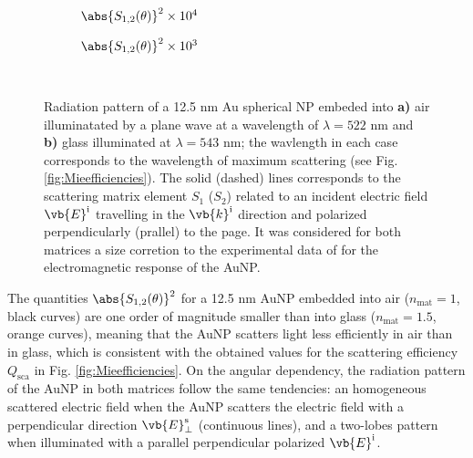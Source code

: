\begin{figure}[h!]
	\def\svgwidth{.9\textwidth} \small\centering
		\vspace*{3.25em}
		\hspace*{-.25\textwidth}
	\begin{subfigure}{.25\textwidth}%
		\caption{$\abs{S_{1,2}(\theta)}^2\times 10^4$} \label{fig:ScatteringMaps:a}%
		\end{subfigure}%
	\begin{subfigure}{.45\textwidth}%
		\caption{$\abs{S_{1,2}(\theta)}^2\times 10^3$}\label{fig:ScatteringMaps:b}%
		\end{subfigure}%
	\vspace*{-6.25em}\\
	\vspace*{-.5em}
	\caption[Radiation Pattern of a 12.5 nm Au Spherical NP embeded into Air and Glass]{Radiation pattern of a 12.5 nm Au spherical NP embeded into \textbf{a)} air illuminatated by a plane wave at a wavelength of $\lambda = 522$ nm and \textbf{b)} glass illuminated at $\lambda = 543$ nm; the wavlength in each case corresponds to the wavelength of maximum scattering (see Fig. \ref{fig:Mieefficiencies}). The solid (dashed) lines corresponds to the scattering matrix element $S_1$ ($S_2$) related to an incident electric field $\vb{E}^\text{i}$ travelling in the $\vb{k}^\text{i}$ direction  and polarized perpendicularly (prallel) to the page. It was considered for both matrices a size corretion to the experimental data of \citeauthor{johnson_optical_1972} \cite{johnson_optical_1972} for the electromagnetic response of the AuNP.}
	\label{fig:ScatteringMaps}
 \end{figure}

The quantities $\abs{S_{1,2}(\theta)}^2$ for a 12.5 nm AuNP embedded into air ($n_\text{mat} = 1$, black curves) are one order of magnitude smaller  than into glass ($n_\text{mat} = 1.5$, orange curves), meaning that the AuNP scatters light less efficiently in air than in glass, which is consistent with the obtained values for the scattering efficiency $Q_\text{sca}$ in Fig. \ref{fig:Mieefficiencies}. On the angular dependency, the radiation pattern of the AuNP in both matrices follow the same tendencies: an homogeneous scattered electric field when the AuNP scatters the electric field with a perpendicular direction  $\vb{E}^\text{s}_\perp$ (continuous lines), and a two-lobes pattern when illuminated with a parallel perpendicular polarized $\vb{E}^\text{i}$.
